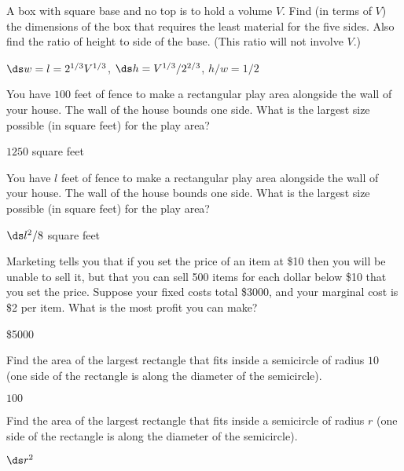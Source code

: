 \begin{exercises}
\begin{exercise}
A box with square base and no top is to hold a volume $V$.  Find (in terms
of $V$) the dimensions of the box that requires the least material for the
five sides.  Also find the ratio of height to side of the base.  (This
ratio will not involve $V$.)
\begin{answer} $\ds w=l=2^{1/3}V^{1/3}$, $\ds h=V^{1/3}/2^{2/3}$, $h/w=1/2$
\end{answer}\end{exercise}

\begin{exercise}
You have $100$ feet of fence to make a rectangular play area alongside the
wall of your house.  The wall of the house bounds one side.  What is the
largest size possible (in square feet) for the play area?
\begin{answer} $1250$ square feet
\end{answer}\end{exercise}

\begin{exercise}
You have $l$ feet of fence to make a rectangular play area alongside the
wall of your house.  The wall of the house bounds one side.  What is the
largest size possible (in square feet) for the play area?
\begin{answer} $\ds l^2/8$ square feet
\end{answer}\end{exercise}

\begin{exercise}
Marketing tells you that if you set the price of an item at \$10
then you will be unable to sell it, but that you can sell 500 items for
each dollar below \$10 that you set the price.  Suppose your fixed costs total
\$3000, and your marginal cost is \$2 per item.  What is the most profit
you can make?
\label{ex:manufacturing}
\begin{answer} \$5000
\end{answer}\end{exercise}

\begin{exercise}
Find the area of the largest rectangle that fits inside a semicircle of
radius $10$ (one side of the rectangle is along the diameter of the
semicircle).
\begin{answer} $100$
\end{answer}\end{exercise}

\begin{exercise}
Find the area of the largest rectangle that fits inside a semicircle of
radius $r$ (one side of the rectangle is along the diameter of the
semicircle).
\begin{answer} $\ds r^2$
\end{answer}\end{exercise}


\end{exercises}
